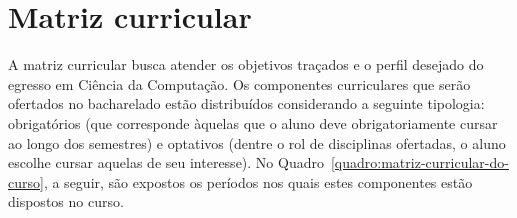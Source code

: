 \documentclass[
	12pt,				%
	openright,			%
  oneside,     %
	a4paper,			%
	chapter=TITLE,		%
	english,			%
	french,				%
	spanish,			%
	brazil				%
	]{abntex2}
\begin{document}
  \section{Matriz curricular}
  
  A matriz curricular busca atender os objetivos traçados e o perfil desejado do egresso em Ciência da Computação. Os componentes curriculares que serão ofertados no bacharelado estão distribuídos considerando a seguinte tipologia: obrigatórios (que corresponde àquelas que o aluno deve obrigatoriamente cursar ao longo dos semestres) e optativos (dentre o rol de disciplinas ofertadas, o aluno escolhe cursar aquelas de seu interesse). No Quadro~\ref{quadro:matriz-curricular-do-curso}, a seguir, são expostos os períodos nos quais estes componentes estão dispostos no curso.
  
  \begin{center}
    

\end{center}
\end{document}
